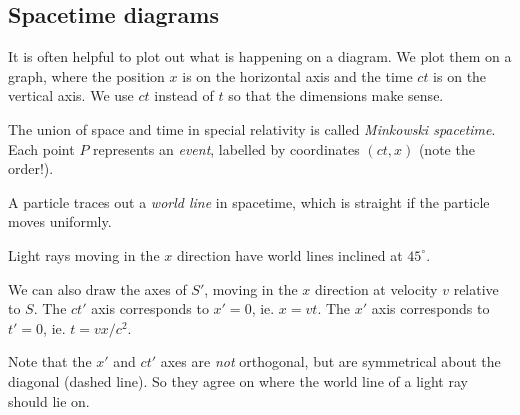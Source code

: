 \documentclass[a4paper]{article}
\begin{document}
\subsection{Spacetime diagrams}
It is often helpful to plot out what is happening on a diagram. We plot them on a graph, where the position $x$ is on the horizontal axis and the time $ct$ is on the vertical axis. We use $ct$ instead of $t$ so that the dimensions make sense.
\begin{center}
\end{center}
\begin{defi}[Spacetime]
  The union of space and time in special relativity is called \emph{Minkowski spacetime}. Each point $P$ represents an \emph{event}, labelled by coordinates $(ct, x)$ (note the order!).

  A particle traces out a \emph{world line} in spacetime, which is straight if the particle moves uniformly.

  Light rays moving in the $x$ direction have world lines inclined at $45^\circ$.
  \begin{center}
  \end{center}
\end{defi}

We can also draw the axes of $S'$, moving in the $x$ direction at velocity $v$ relative to $S$. The $ct'$ axis corresponds to $x' = 0$, ie. $x = vt$. The $x'$ axis corresponds to $t' = 0$, ie. $t = vx/c^2$.
\begin{center}
\end{center}
Note that the $x'$ and $ct'$ axes are \emph{not} orthogonal, but are symmetrical about the diagonal (dashed line). So they agree on where the world line of a light ray should lie on.
\end{document}
